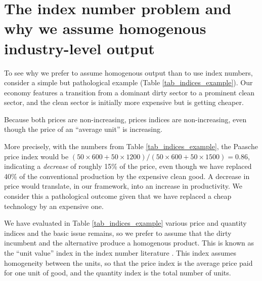 

\section{The index number problem and why we assume homogenous industry-level output}
\label{appendix:index_numbers}

To see why we prefer to assume homogenous output than to use index numbers, consider a simple but pathological example (Table \ref{tab_indices_example}). Our economy features a transition from a dominant dirty sector to a prominent clean sector, and the clean sector is initially more expensive but is getting cheaper. 



Because both prices are non-increasing, prices indices are non-increasing, even though the price of an ``average unit'' is increasing.

More precisely, with the numbers from Table \ref{tab_indices_example}, the Paasche price index would be $(50\times600+50\times 1200)/(50\times600+50\times1500)=0.86$, indicating a \textit{decrease} of roughly 15\% of the price, even though we have replaced 40\% of the conventional production by the expensive clean good. A decrease in price would translate, in our framework, into an increase in productivity. We consider this a pathological outcome given that we have replaced a cheap technology by an expensive one. 

We have evaluated in Table \ref{tab_indices_example} various price and quantity indices and the basic issue remains, so we prefer to assume that the dirty incumbent and the alternative produce a homogenous product. This is known as the ``unit value'' index in the index number literature \citep{balk2012price}. This index assumes homogeneity between the units, so that the price index is the average price paid for one unit of good, and the quantity index is the total number of units.






